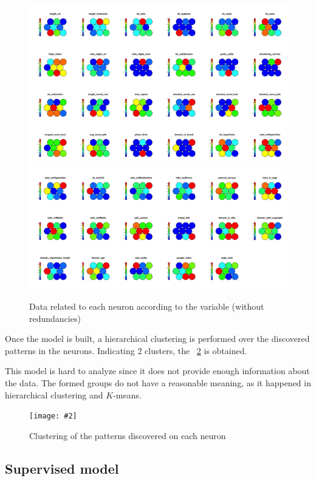 \documentclass[12pt, a4paper]{article}
\newcommand*{\figref}[1]{\figurename~\ref{fig:#1}}
\newcommand{\figcaption}[4][H]{
  \begin{figure}[#1]
    \centering
    \texttt{[image: \#2]}
    \caption{#3}
    \label{fig:#2}
  \end{figure}
}
\newcommand*{\kmeans}{$K$-means}
\begin{document}
      \begin{figure}[H]
        \centering
        \includegraphics[width=1\textwidth]{maps1_nr.png}
        \includegraphics[width=1\textwidth]{maps2_nr.png}
        \caption{Data related to each neuron according to the variable (without redundancies)}
        \label{fig:maps_nr.png}
      \end{figure}

      Once the model is built, a hierarchical clustering is performed over the discovered patterns in the neurons. Indicating $2$ clusters, the \figref{cluster_som.png} is obtained.

      This model is hard to analyze since it does not provide enough information about the data. The formed groups do not have a reasonable meaning, as it happened in hierarchical clustering and \kmeans.

      \figcaption{cluster_som.png}{Clustering of the patterns discovered on each neuron}{1}

    \subsection{Supervised model}
\end{document}
